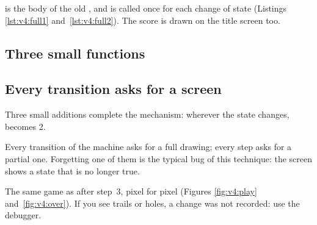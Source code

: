 

 is the body of the old , and is called
once for each change of state (Listings \ref{lst:v4:full1}
and~\ref{lst:v4:full2}). The score is drawn on the title screen too.

\subsection{Three small functions}




\subsection{Every transition asks for a screen}

Three small additions complete the mechanism: wherever the state changes,
 becomes 2.




\begin{prgwarn}
Every transition of the machine asks for a full drawing; every step asks for
a partial one. Forgetting one of them is the typical bug of this technique:
the screen shows a state that is no longer true.
\end{prgwarn}

\begin{prgcheck}
The same game as after step~3, pixel for pixel (Figures \ref{fig:v4:play}
and~\ref{fig:v4:over}). If you see trails or holes, a change was not
recorded: use the debugger.
\end{prgcheck}

